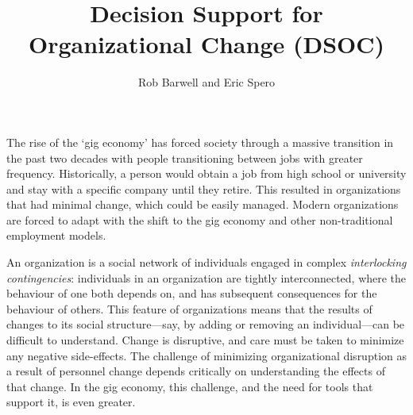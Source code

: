 \message{ !name(FinalPaper.tex)}\documentclass[journal]{vgtc}                %
\title{Decision Support for Organizational Change (DSOC)}
\author{Rob Barwell and Eric Spero}
\begin{document}



\maketitle


The rise of the \lq gig economy\rq{}\cite{de2015rise,friedman2014workers} has forced society through a massive transition in the past two decades with people transitioning between jobs with greater frequency.  Historically, a person would obtain a job from high school or university and stay with a specific company until they retire.  This resulted in organizations that had minimal change, which could be easily managed. Modern organizations are forced to adapt with the shift to the gig economy and other non-traditional employment models.  

An organization is a social network\cite{scott1988social} of individuals engaged in complex \emph{interlocking contingencies}\cite{glenn2006complexity}: individuals in an organization are tightly interconnected, where the behaviour of one both depends on, and has subsequent consequences for the behaviour of others\cite{glenn2006complexity}. This feature of organizations means that the results of changes to its social structure---say, by adding or removing an individual---can be difficult to understand. Change is disruptive, and care must be taken to minimize any negative side-effects. The challenge of minimizing organizational disruption as a result of personnel change depends critically on understanding the effects of that change. In the gig economy, this challenge, and the need for tools that support it, is even greater. 
\end{document}
